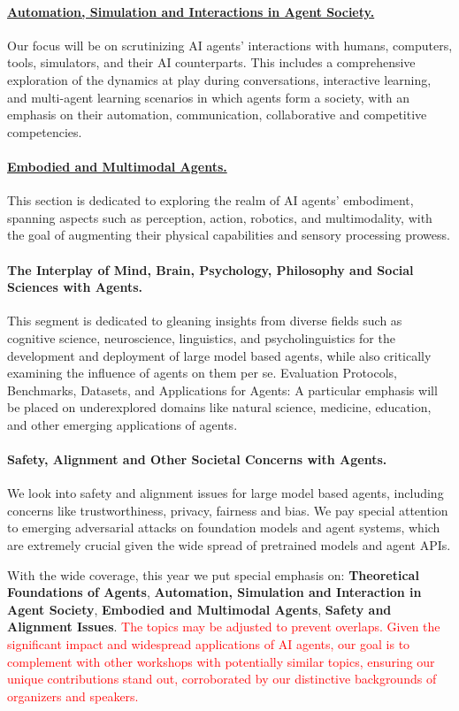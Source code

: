 \documentclass[10pt]{article} %
\begin{document}
\paragraph{\underline{Automation, Simulation and Interactions in Agent Society.}} Our focus will be on scrutinizing AI agents' interactions with humans, computers, tools, simulators, and their AI counterparts. This includes a comprehensive exploration of the dynamics at play during conversations, interactive learning, and multi-agent learning scenarios in which agents form a society, with an emphasis on their automation, communication, collaborative and competitive competencies.

\paragraph{\underline{Embodied and Multimodal Agents.}} This section is dedicated to exploring the realm of AI agents' embodiment, spanning aspects such as perception, action, robotics, and multimodality, with the goal of augmenting their physical capabilities and sensory processing prowess. 

\paragraph{The Interplay of Mind, Brain, Psychology, Philosophy and Social Sciences with Agents.} This segment is dedicated to gleaning insights from diverse fields such as cognitive science, neuroscience, linguistics, and psycholinguistics for the development and deployment of large model based agents, while also critically examining the influence of agents on them per se.
Evaluation Protocols, Benchmarks, Datasets, and Applications for Agents: A particular emphasis will be placed on underexplored domains like natural science, medicine, education, and other emerging applications of agents.

\paragraph{Safety, Alignment and Other Societal Concerns with Agents.} We look into safety and alignment issues for large model based agents, including concerns like trustworthiness, privacy, fairness and bias. We pay special attention to emerging adversarial attacks on foundation models and agent systems, which are extremely crucial given the wide spread of pretrained models and agent APIs. 


With the wide coverage, this year we put special emphasis on: {\bf Theoretical Foundations of Agents}, {\bf Automation, Simulation and Interaction in Agent Society}, {\bf Embodied and Multimodal Agents}, {\bf Safety and Alignment Issues}. \textcolor{red}{The topics may be adjusted to prevent overlaps. Given the significant impact and widespread applications of AI agents, our goal is to complement with other workshops with potentially similar topics, ensuring our unique contributions stand out, corroborated by our distinctive backgrounds of organizers and speakers.}
\end{document}

